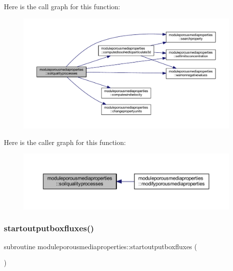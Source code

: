 Here is the call graph for this function\+:\nopagebreak
\begin{figure}[H]
\begin{center}
\leavevmode
\includegraphics[width=350pt]{namespacemoduleporousmediaproperties_a2045bbe7b3450cd88b6aae4509fbe0c5_cgraph}
\end{center}
\end{figure}
Here is the caller graph for this function\+:\nopagebreak
\begin{figure}[H]
\begin{center}
\leavevmode
\includegraphics[width=350pt]{namespacemoduleporousmediaproperties_a2045bbe7b3450cd88b6aae4509fbe0c5_icgraph}
\end{center}
\end{figure}
\mbox{\label{namespacemoduleporousmediaproperties_a0c7ca57252cdb274ae0ce23c3deeba74}} 
\subsubsection{\texorpdfstring{startoutputboxfluxes()}{startoutputboxfluxes()}}
{\footnotesize\ttfamily subroutine moduleporousmediaproperties\+::startoutputboxfluxes (\begin{DoxyParamCaption}{ }\end{DoxyParamCaption})\hspace{0.3cm}{\ttfamily [private]}}

